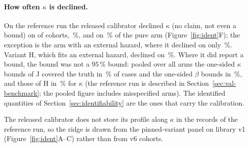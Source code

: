 \paragraph{How often $\kappa$ is declined.} On the reference run the released calibrator declined $\kappa$ (no claim, not even a bound) on
 of  cohorts, \,\%, and on \,\% of the pure
arm (Figure~\ref{fig:ident}F); the exception is the arm with an external hazard, where it declined on only
\,\%. Variant H, which fits an external hazard, declined on
\,\%. Where it did report a bound, the bound was not a $95\,\%$ bound: pooled over all arms the
one-sided $\kappa$ bounds of J covered the truth in \,\% of cases and the one-sided $\beta$
bounds in \,\%, and those of H in \,\% for $\kappa$ (the reference run is
described in Section~\ref{sec:val-benchmark}; the pooled figure includes misspecified arms). The identified quantities of
Section~\ref{sec:identifiability} are the ones that carry the calibration.

The released calibrator does not store its profile along $\kappa$ in the records of the reference run, so the ridge
is drawn from the pinned-variant panel on library v1 (Figure~\ref{fig:ident}A--C) rather than from v6 cohorts.
